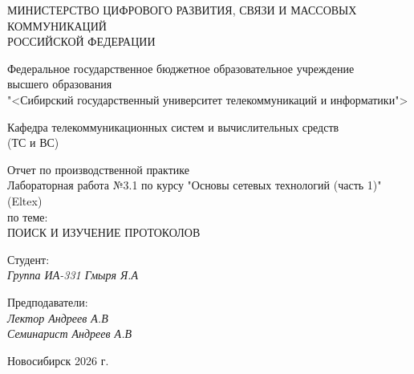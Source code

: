 \thispagestyle{empty}

\begin{center}
    МИНИСТЕРСТВО ЦИФРОВОГО РАЗВИТИЯ, СВЯЗИ И МАССОВЫХ КОММУНИКАЦИЙ \\ РОССИЙСКОЙ ФЕДЕРАЦИИ

    \vspace{20pt}

    Федеральное государственное бюджетное образовательное учреждение  \\  высшего образования \\
    "<Сибирский государственный университет телекоммуникаций и информатики"> \\

    \vspace{20pt}

    Кафедра телекоммуникационных систем и вычислительных средств \\  (ТС и ВС)
\end{center}

\vfill

\begin{center}
    Отчет по производственной практике \\  
    Лабораторная работа №3.1 по курсу "Основы сетевых технологий (часть 1)" (Eltex) \\
    \vspace{20pt}
    по теме: \\
    \uppercase{Поиск и изучение протоколов}
\end{center}

\vfill

    \noindent Студент: \\
    \textit{Группа ИА-331 \hfill Гмыря Я.А}

    \vspace{20pt}

    \noindent Предподаватели: \\
    \textit{Лектор \hfill Андреев А.В} \\
    \textit{Семинарист \hfill Андреев А.В}

\vfill

\begin{center}
    Новосибирск 2026 г.
\end{center}